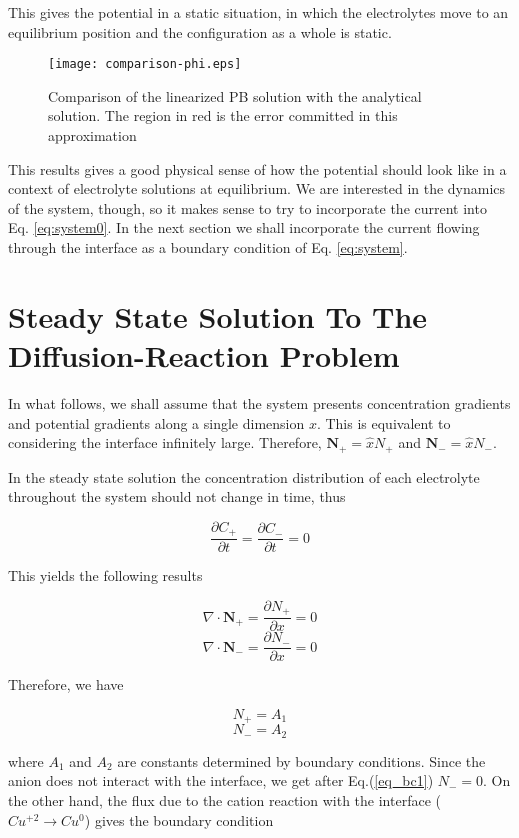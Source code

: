 This gives the potential in a static situation, in which the electrolytes move to an equilibrium position and the configuration as a whole is static. 

\begin{figure}[h!]
\label{fig:comparison}
 \centering
 \texttt{[image: comparison-phi.eps]}
 \caption{Comparison of the linearized PB solution with the analytical solution. The region in red is the error committed in this approximation}
\end{figure}

This results gives a good physical sense of how the potential should look like in a context of electrolyte solutions at equilibrium. We are interested in the dynamics of the system, though, so it makes sense to try to incorporate the current into Eq. \ref{eq:system0}. In the next section we shall incorporate the current flowing through the interface as a boundary condition of Eq. \ref{eq:system}.

\section{Steady State Solution To The Diffusion-Reaction Problem}

In what follows, we shall assume that the system presents concentration gradients and
potential gradients along a single dimension $x$. This is equivalent to considering the interface infinitely large. Therefore, $\mathbf{N}_{+} = \hat{x}N_{+}$ and $\mathbf{N}_{-} = \hat{x}N_{-}$. 

In the steady state solution the concentration distribution of each electrolyte throughout the system should not change in time, thus

$$\frac{\partial C_+}{\partial t} = \frac{\partial C_-}{\partial t} = 0$$

This yields the following results

$$\nabla\cdot \mathbf{N}_+ = \frac{\partial N_{+}}{\partial x}=0$$
$$\nabla \cdot \mathbf{N}_- = \frac{\partial N_{-}}{\partial x}=0$$

Therefore, we have

$$N_+ = A_1$$
$$N_- = A_2$$

where $A_1$ and $A_2$ are constants determined by boundary conditions. Since the anion does not interact with the interface, we get after Eq.(\ref{eq_bc1})
$N_- = 0$. On the other hand, the flux due to the cation reaction with the interface ($Cu^{+2}\rightarrow Cu^{0}$) gives the boundary condition

